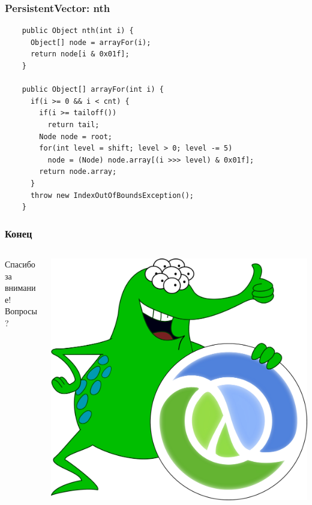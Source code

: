 \documentclass[rpussian]{beamer}
\begin{document}
\begin{frame}[fragile]
  \frametitle{PersistentVector: nth}
  \begin{verbatim}
    public Object nth(int i) {
      Object[] node = arrayFor(i);
      return node[i & 0x01f];
    }

    public Object[] arrayFor(int i) {
      if(i >= 0 && i < cnt) {
        if(i >= tailoff())
          return tail;
        Node node = root;
        for(int level = shift; level > 0; level -= 5)
          node = (Node) node.array[(i >>> level) & 0x01f];
        return node.array;
      }
      throw new IndexOutOfBoundsException();
    }

  \end{verbatim}
\end{frame}

\begin{frame}
  \frametitle{Конец}
  \begin{columns}[c]
    \begin{column}{.5\textwidth}
      \begin{center}
        Спасибо за внимание!
        \\ \vspace{1cm}
        Вопросы?
      \end{center}
    \end{column}
    \begin{column}{.5\textwidth}
      \includegraphics[width=\textwidth,keepaspectration]{alien}
    \end{column}
  \end{columns}
\end{frame}
\end{document}
